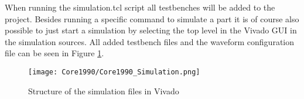 	When running the simulation.tcl script all testbenches will be added to the project. Besides running a specific command to simulate a part it is of course also possible to just start a simulation by selecting the top level in the Vivado GUI in the simulation sources. All added testbench files and the waveform configuration file can be seen in Figure \ref{fig:Core1990_Simulation}.
	
	\begin{figure}[H]
		\centering
		\texttt{[image: Core1990/Core1990\_Simulation.png]}	
		\caption{Structure of the simulation files in Vivado}
		\label{fig:Core1990_Simulation}
	\end{figure}
	